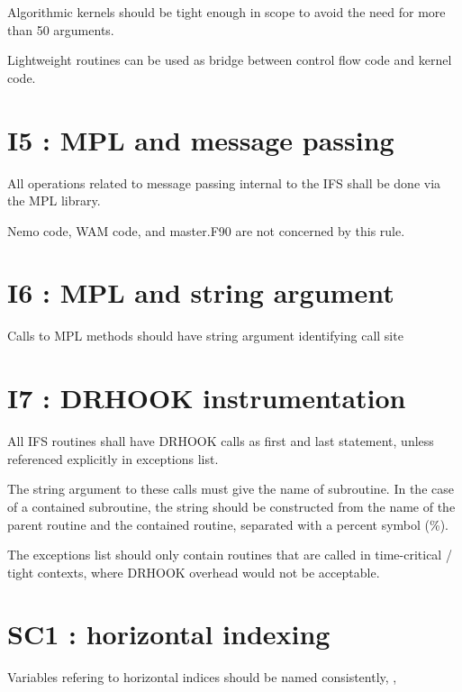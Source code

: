 \documentclass[letterpaper,10pt,english]{sphinxmanual}
\begin{document}
Algorithmic kernels should be tight enough in scope to avoid the need for more than 50 arguments.

Lightweight  routines can be used as bridge between control flow code and kernel code.


\section{I5 : MPL and message passing}
\label{\detokenize{rules/I5:i5-mpl-and-message-passing}}\label{\detokenize{rules/I5::doc}}
All operations related to message passing internal to the IFS shall be done via the MPL library.

Nemo code, WAM code, and master.F90 are not concerned by this rule.


\section{I6 : MPL and string argument}
\label{\detokenize{rules/I6:i6-mpl-and-string-argument}}\label{\detokenize{rules/I6::doc}}
Calls to MPL methods should have string argument identifying call site


\section{I7 : DRHOOK instrumentation}
\label{\detokenize{rules/I7:i7-drhook-instrumentation}}\label{\detokenize{rules/I7::doc}}
All IFS routines shall have DRHOOK calls as first and last statement, unless referenced
explicitly in exceptions list.

The string argument to these calls must give the name of subroutine.
In the case of a contained subroutine, the string should be constructed from the name of the
parent routine and the contained routine, separated with a percent symbol (\%).

The exceptions list should only contain routines that are called in time-critical / tight contexts,
where DRHOOK overhead would not be acceptable.


\section{SC1 : horizontal indexing}
\label{\detokenize{rules/SC1:sc1-horizontal-indexing}}\label{\detokenize{rules/SC1::doc}}
Variables refering to horizontal indices should be named consistently, , 
\end{document}
